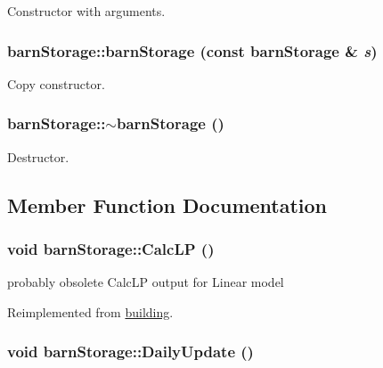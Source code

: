 Constructor with arguments. \hypertarget{classbarn_storage_ae77c49e50fc296f74857e4dd5a127e6e}{
\subsubsection[{barnStorage}]{\setlength{\rightskip}{0pt plus 5cm}barnStorage::barnStorage (const {\bf barnStorage} \& {\em s})}}
\label{classbarn_storage_ae77c49e50fc296f74857e4dd5a127e6e}


Copy constructor. \hypertarget{classbarn_storage_a62d94a9580e2fdfcd040e9262fb683ba}{
\subsubsection[{$\sim$barnStorage}]{\setlength{\rightskip}{0pt plus 5cm}barnStorage::$\sim$barnStorage ()}}
\label{classbarn_storage_a62d94a9580e2fdfcd040e9262fb683ba}


Destructor. 

\subsection{Member Function Documentation}
\hypertarget{classbarn_storage_a5c4a88279dcfa290b08db30d075e1756}{
\subsubsection[{CalcLP}]{\setlength{\rightskip}{0pt plus 5cm}void barnStorage::CalcLP ()}}
\label{classbarn_storage_a5c4a88279dcfa290b08db30d075e1756}


probably obsolete CalcLP output for Linear model 

Reimplemented from \hyperlink{classbuilding_af1f27cbf72295547af61edc9e02a7e61}{building}.\hypertarget{classbarn_storage_ac98e6005a3cb00a07d128931d2a6feb1}{
\subsubsection[{DailyUpdate}]{\setlength{\rightskip}{0pt plus 5cm}void barnStorage::DailyUpdate ()}}
\label{classbarn_storage_ac98e6005a3cb00a07d128931d2a6feb1}


